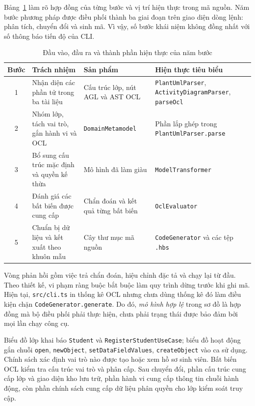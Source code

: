Bảng~\ref{tab:hop-dong-buoc-chuyen-doi} làm rõ hợp đồng của từng bước và vị trí hiện thực trong mã nguồn. Năm bước phương pháp được điều phối thành ba giai đoạn trên giao diện dòng lệnh: phân tích, chuyển đổi và sinh mã. Vì vậy, số bước khái niệm không đồng nhất với số thông báo tiến độ của CLI.

\begin{table}[htbp]
\centering
\caption{Đầu vào, đầu ra và thành phần hiện thực của năm bước}
\label{tab:hop-dong-buoc-chuyen-doi}
\small
\begin{tabularx}{\textwidth}{@{}cXXX@{}}
\toprule
\textbf{Bước} & \textbf{Trách nhiệm} & \textbf{Sản phẩm} & \textbf{Hiện thực tiêu biểu} \\
\midrule
1 & Nhận diện các phần tử trong ba tài liệu & Cấu trúc lớp, nút AGL và AST OCL & \texttt{PlantUmlParser}, \texttt{ActivityDiagramParser}, \texttt{parseOcl} \\
2 & Nhóm lớp, tách vai trò, gắn hành vi và OCL & \texttt{DomainMetamodel} & Phần lắp ghép trong \texttt{PlantUmlParser.parse} \\
3 & Bổ sung cấu trúc mặc định và quyền kế thừa & Mô hình đã làm giàu & \texttt{ModelTransformer} \\
4 & Đánh giá các bất biến được cung cấp & Chẩn đoán và kết quả từng bất biến & \texttt{OclEvaluator} \\
5 & Chuẩn bị dữ liệu và kết xuất theo khuôn mẫu & Cây thư mục mã nguồn & \texttt{CodeGenerator} và các tệp \texttt{.hbs} \\
\bottomrule
\end{tabularx}
\end{table}

Vòng phản hồi gồm việc trả chẩn đoán, hiệu chỉnh đặc tả và chạy lại từ đầu. Theo thiết kế, vi phạm ràng buộc bắt buộc làm quy trình dừng trước khi ghi mã. Hiện tại, \texttt{src/cli.ts} in thống kê OCL nhưng chưa dùng thống kê đó làm điều kiện chặn \texttt{CodeGenerator.generate}. Do đó, \emph{mô hình hợp lệ} trong sơ đồ là hợp đồng mà bộ điều phối phải thực hiện, chưa phải trạng thái được bảo đảm bởi mọi lần chạy công cụ.

\begin{vidu}
Biểu đồ lớp khai báo \texttt{Student} và \texttt{RegisterStudent\allowbreak{}UseCase}; biểu đồ hoạt động gắn chuỗi \texttt{open}, \texttt{new\allowbreak{}Object}, \texttt{setData\allowbreak{}Field\allowbreak{}Values}, \texttt{create\allowbreak{}Object} vào ca sử dụng. Chính sách xác định vai trò nào được tạo hoặc xem hồ sơ sinh viên. Bất biến OCL kiểm tra cấu trúc vai trò và phân cấp. Sau chuyển đổi, phần cấu trúc cung cấp lớp và giao diện kho lưu trữ, phần hành vi cung cấp thông tin chuỗi hành động, còn phần chính sách cung cấp dữ liệu phân quyền cho lớp kiểm soát truy cập.
\end{vidu}

